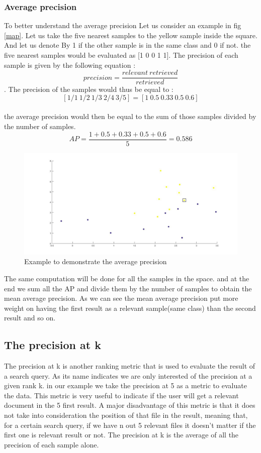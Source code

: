 \documentclass[hidelinks,12pt]{report}
\begin{document}
\subsubsection{Average precision}
To better understand the average precision Let us consider an example  in fig \ref{map}. Let us take the five nearest samples to the yellow sample inside the square. And let us denote By 1 if the other sample is in the same class and 0 if not. the five nearest samples would be evaluated as [1 0 0 1 1]. The precision of each sample is given by the following equation : $$precision=\frac{relevant\  retrieved}{retrieved}$$. The precision of the samples would thus be equal to : $$[1/1 \  1/2 \ 1/3\  2/4\  3/5]=[1 \ 0.5 \   0.33 \ 0.5 \ 0.6]$$\\ the average precision would then be equal to the sum of those samples divided by the number of samples.$$AP=\frac{1+0.5+0.33+0.5+0.6}{5}=0.586$$
\begin{figure}[t!]
  
  \centering
	    \includegraphics[width=1\textwidth]{fig1.jpg}
    \caption{Example to demonstrate the average precision}
    \label{map}
    \label{fig:toto}
\end{figure}
The same computation will be done for all the samples in the space. and at the end we sum all the AP and divide them by the number of samples to obtain the mean average precision. As we can see the mean average precision put more weight on having the first result as a relevant sample(same class) than the second result and so on.
\subsection{The precision at k}
The precision at k is another ranking metric that is used to evaluate the result of a search query. As  its name indicates we are only interested of the precision at a given rank k. in our example we take the precision at 5 as a metric to evaluate the data. This metric is very useful to indicate if the user will get a relevant document in the 5 first result. A major disadvantage of this metric is that it does not take into consideration the position of that file in the result, meaning that, for a certain search query, if we have n out 5 relevant files it doesn't matter if the first one is relevant result or not. The precision at k is the average of all the precision of each sample alone.
\end{document}
